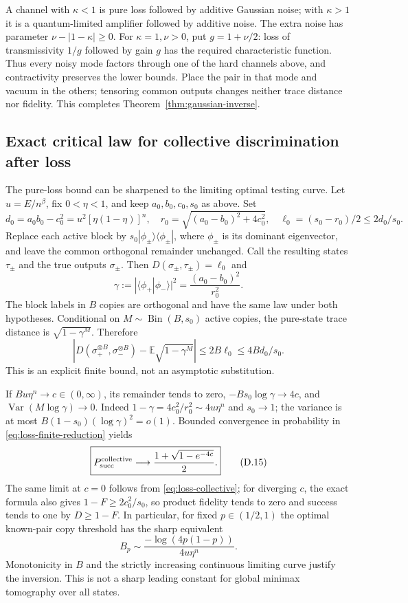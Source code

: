 A channel with $\kappa<1$ is pure loss followed by additive Gaussian noise;
with $\kappa>1$ it is a quantum-limited amplifier followed by additive noise.
The extra noise has parameter $\nu-|1-\kappa|\ge0$.
For $\kappa=1,\nu>0$, put $g=1+\nu/2$: loss of transmissivity $1/g$
followed by gain $g$ has the required characteristic function.
Thus every noisy mode factors through one of the hard channels above, and
contractivity preserves the lower bounds. Place the pair in that mode and
vacuum in the others; tensoring common outputs changes neither trace
distance nor fidelity. This completes Theorem~\ref{thm:gaussian-inverse}.

\subsection{Exact critical law for collective discrimination after loss}
The pure-loss bound can be sharpened to the limiting optimal testing curve.
Let $u=E/n^\beta$, fix $0<\eta<1$, and keep $a_0,b_0,c_0,s_0$ as above.
Set
\[
 d_0=a_0b_0-c_0^2=u^2[\eta(1-\eta)]^n,\quad
 r_0=\sqrt{(a_0-b_0)^2+4c_0^2},\quad
 \ell_0=(s_0-r_0)/2\le2d_0/s_0.
\]
Replace each active block by $s_0|\phi_\pm\rangle\langle\phi_\pm|$, where
$\phi_\pm$ is its dominant eigenvector, and leave the common orthogonal
remainder unchanged. Call the resulting states $\tau_\pm$ and the true
outputs $\sigma_\pm$. Then $D(\sigma_\pm,\tau_\pm)=\ell_0$ and
\[
 \gamma:=|\langle\phi_+|\phi_-\rangle|^2
                  =\frac{(a_0-b_0)^2}{r_0^2}.
\]
The block labels in $B$ copies are orthogonal and have the same law under
both hypotheses. Conditional on $M\sim\operatorname{Bin}(B,s_0)$ active
copies, the pure-state trace distance is $\sqrt{1-\gamma^M}$. Therefore
\[
 \left|D(\sigma_+^{\otimes B},\sigma_-^{\otimes B})
       -\mathbb E\sqrt{1-\gamma^M}\right|
                  \le2B\ell_0\le4Bd_0/s_0.
 \tag{D.14}\label{eq:loss-finite-reduction}
\]
This is an explicit finite bound, not an asymptotic substitution.

If $Bu\eta^n\to c\in(0,\infty)$, its remainder tends to zero,
$-Bs_0\log\gamma\to4c$, and
$\operatorname{Var}(M\log\gamma)\to0$.
Indeed $1-\gamma=4c_0^2/r_0^2\sim4u\eta^n$ and $s_0\to1$;
the variance is at most $B(1-s_0)(\log\gamma)^2=o(1)$.
Bounded convergence in probability in \eqref{eq:loss-finite-reduction} yields
\[
 \boxed{P_{\rm succ}^{\rm collective}\longrightarrow
                   \frac{1+\sqrt{1-e^{-4c}}}{2}.}
 \tag{D.15}\label{eq:loss-critical-law}
\]
The same limit at $c=0$ follows from \eqref{eq:loss-collective}; for diverging
$c$, the exact formula also gives $1-F\ge2c_0^2/s_0$, so product fidelity tends to zero
and success tends to one by $D\ge1-F$.
In particular, for fixed $p\in(1/2,1)$ the optimal known-pair copy threshold
has the sharp equivalent
\[
 B_p\sim\frac{-\log(4p(1-p))}{4u\eta^n}.
 \tag{D.16}\label{eq:loss-threshold}
\]
Monotonicity in $B$ and the strictly increasing continuous limiting curve
justify the inversion. This is not a sharp leading constant for global
minimax tomography over all states.

